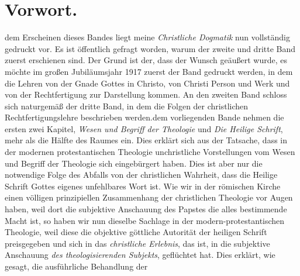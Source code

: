 \section*{Vorwort.}\n\nMit dem Erscheinen dieses Bandes liegt meine \emph{Christliche Dogmatik} nun vollständig gedruckt vor. Es ist öffentlich gefragt worden, warum der zweite und dritte Band zuerst erschienen sind. Der Grund ist der, dass der Wunsch geäußert wurde, es möchte im großen Jubiläumsjahr 1917 zuerst der Band gedruckt werden, in dem die Lehren von der Gnade Gottes in Christo, von Christi Person und Werk und von der Rechtfertigung zur Darstellung kommen. An den zweiten Band schloss sich naturgemäß der dritte Band, in dem die Folgen der christlichen Rechtfertigungslehre beschrieben werden.\n\nIn dem vorliegenden Bande nehmen die ersten zwei Kapitel, \emph{Wesen und Begriff der Theologie} und \emph{Die Heilige Schrift}, mehr als die Hälfte des Raumes ein. Dies erklärt sich aus der Tatsache, dass in der modernen protestantischen Theologie unchristliche Vorstellungen vom Wesen und Begriff der Theologie sich eingebürgert haben. Dies ist aber nur die notwendige Folge des Abfalls von der christlichen Wahrheit, dass die Heilige Schrift Gottes eigenes unfehlbares Wort ist. Wie wir in der römischen Kirche einen völligen prinzipiellen Zusammenhang der christlichen Theologie vor Augen haben, weil dort die subjektive Anschauung des Papstes die alles bestimmende Macht ist, so haben wir nun dieselbe Sachlage in der modern-protestantischen Theologie, weil diese die objektive göttliche Autorität der heiligen Schrift preisgegeben und sich in das \emph{christliche Erlebnis}, das ist, in die subjektive Anschauung \emph{des theologisierenden Subjekts}, geflüchtet hat. Dies erklärt, wie gesagt, die ausführliche Behandlung der